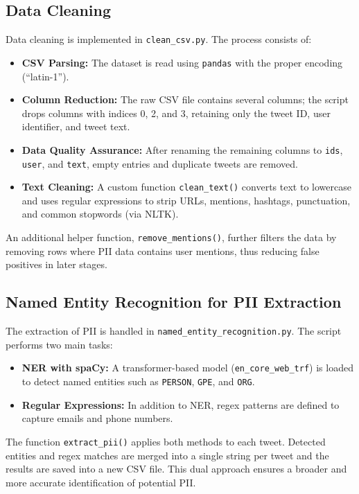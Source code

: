 \documentclass{article}
\begin{document}
\subsection{Data Cleaning}
Data cleaning is implemented in \texttt{clean\_csv.py}. The process consists of:
\begin{itemize}
    \item \textbf{CSV Parsing:} The dataset is read using \texttt{pandas} with the proper encoding (``latin-1'').
    \item \textbf{Column Reduction:} The raw CSV file contains several columns; the script drops columns with indices 0, 2, and 3, retaining only the tweet ID, user identifier, and tweet text.
    \item \textbf{Data Quality Assurance:} After renaming the remaining columns to \texttt{ids}, \texttt{user}, and \texttt{text}, empty entries and duplicate tweets are removed.
    \item \textbf{Text Cleaning:} A custom function \texttt{clean\_text()} converts text to lowercase and uses regular expressions to strip URLs, mentions, hashtags, punctuation, and common stopwords (via NLTK).
\end{itemize}
An additional helper function, \texttt{remove\_mentions()}, further filters the data by removing rows where PII data contains user mentions, thus reducing false positives in later stages.

\subsection{Named Entity Recognition for PII Extraction}
The extraction of PII is handled in \texttt{named\_entity\_recognition.py}. The script performs two main tasks:
\begin{itemize}
    \item \textbf{NER with spaCy:} A transformer-based model (\texttt{en\_core\_web\_trf}) is loaded to detect named entities such as \texttt{PERSON}, \texttt{GPE}, and \texttt{ORG}.
    \item \textbf{Regular Expressions:} In addition to NER, regex patterns are defined to capture emails and phone numbers.
\end{itemize}
The function \texttt{extract\_pii()} applies both methods to each tweet. Detected entities and regex matches are merged into a single string per tweet and the results are saved into a new CSV file. This dual approach ensures a broader and more accurate identification of potential PII.
\end{document}
